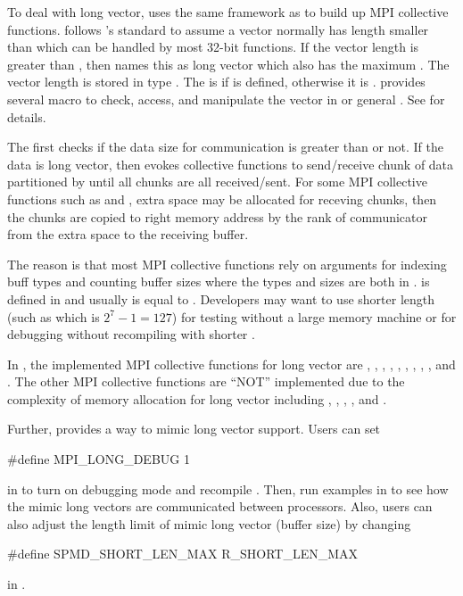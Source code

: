 To deal with long vector,
 uses the same framework as  to build up MPI
collective functions.  follows 's standard to
assume a vector normally has length smaller than 
which can be handled by most 32-bit functions. If the vector length
is greater than , then  names this as
long vector which also has the maximum . The vector length
is stored in type . The  is  if
 is defined, otherwise it is .
 provides several  macro to check, access, and
manipulate the vector in  or general .
See  for details.

The  first checks if the data size for
communication is greater than  or not.
If the data is long vector, then  evokes collective functions
to send/receive chunk of data partitioned by  until
all chunks are all received/sent.
For some MPI collective functions such as
 and , extra space may be allocated
for receving chunks, then the chunks are copied to right memory address
by the rank of communicator from the extra space to the receiving buffer.

The reason is that most MPI collective functions rely on arguments
for indexing buff types and counting buffer sizes where the types and sizes
are both in .
 is defined in  and
usually is equal to . Developers may want to
use shorter length (such as  which is $2^7 - 1 = 127$)
for testing without a large memory machine or
for debugging without recompiling  with shorter
.

In ,
the implemented MPI collective functions for long vector are
, ,
, , , ,
, , , and .
The other MPI collective functions are
``NOT'' implemented due to the complexity of memory allocation for long vector
including , , ,
, and .

Further,  provides a way to mimic long vector support.
Users can set 
\begin{Command}[title=pkg\_constant.h,language=C]
#define MPI_LONG_DEBUG 1
\end{Command}
in 
to turn on debugging mode and recompile . Then, run examples in
 to see how the mimic
long vectors are communicated between processors. Also, users can also adjust
the length limit of mimic long vector (buffer size)
by changing
\begin{Command}[title=spmd.h,language=C]
#define SPMD_SHORT_LEN_MAX R_SHORT_LEN_MAX
\end{Command}
in .



